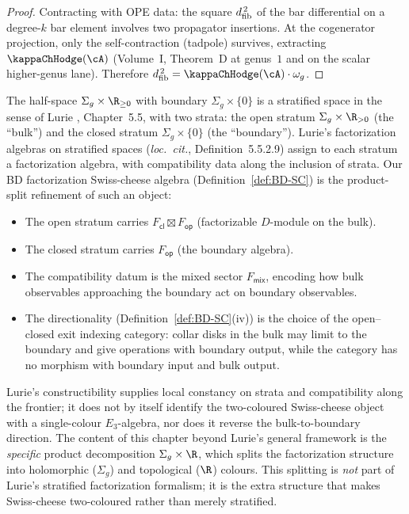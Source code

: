 \begin{proof}
Contracting with OPE data: the square $d_{\mathrm{fib}}^{\,2}$ of the
bar differential on a degree-$k$ bar element involves two
propagator insertions. At the cogenerator projection, only
the self-contraction (tadpole) survives, extracting
$\kappaChHodge(\cA)$ \textup{(}Volume~I, Theorem~D at genus~$1$ and on the
scalar higher-genus lane\textup{)}. Therefore
$\dfib^{\,2} = \kappaChHodge(\cA) \cdot \omega_g$.
\end{proof}

\begin{remark}
\label{rem:lurie-comparison}
The half-space $\Sigma_g \times \R_{\geq 0}$ with boundary
$\Sigma_g \times \{0\}$ is a stratified space in the sense of
Lurie \cite{HA}, Chapter~5.5, with two strata: the open stratum
$\Sigma_g \times \R_{>0}$ (the ``bulk'') and the closed stratum
$\Sigma_g \times \{0\}$ (the ``boundary''). Lurie's
factorization algebras on stratified spaces
(\emph{loc.\ cit.}, Definition~5.5.2.9) assign to each stratum
a factorization algebra, with compatibility data along the
inclusion of strata. Our BD factorization Swiss-cheese algebra
(Definition~\ref{def:BD-SC}) is the product-split refinement of such
an object:
\begin{itemize}
\item The open stratum carries $F_{\mathsf{cl}} \boxtimes
 F_{\mathsf{op}}$ (factorizable $D$-module on the bulk).
\item The closed stratum carries $F_{\mathsf{op}}$ (the boundary
 algebra).
\item The compatibility datum is the mixed sector
 $F_{\mathsf{mix}}$, encoding how bulk observables approaching the
 boundary act on boundary observables.
\item The directionality (Definition~\ref{def:BD-SC}(iv)) is the
 choice of the open--closed exit indexing category: collar disks in
 the bulk may limit to the boundary and give operations with boundary
 output, while the category has no morphism with boundary input and
 bulk output.
\end{itemize}
Lurie's constructibility supplies local constancy on strata and
compatibility along the frontier; it does not by itself identify the
two-coloured Swiss-cheese object with a single-colour $E_3$-algebra,
nor does it reverse the bulk-to-boundary direction. The content of
this chapter beyond Lurie's general framework is the \emph{specific}
product decomposition
$\Sigma_g \times \R$, which splits the factorization structure
into holomorphic ($\Sigma_g$) and topological ($\R$) colours.
This splitting is \emph{not} part of Lurie's stratified
factorization formalism; it is the extra structure that makes
Swiss-cheese two-coloured rather than merely stratified.
\end{remark}


